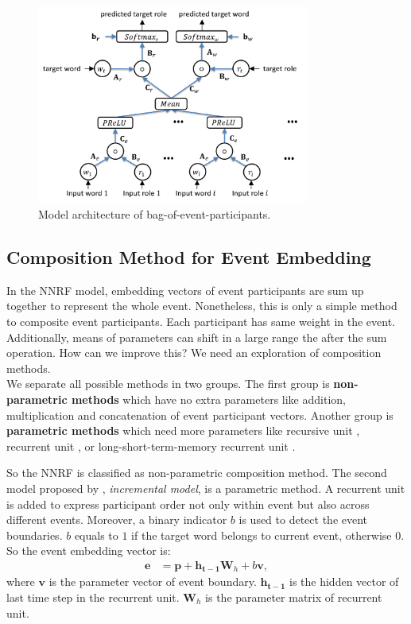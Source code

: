 \documentclass[a4paper]{article}
\begin{document}
\begin{figure}[t]
\centering
\includegraphics[width=0.8\textwidth]{BOP.png}
\caption{\label{fig:BOP} Model architecture of bag-of-event-participants.}
\end{figure}


\subsection{Composition Method for Event Embedding} \label{sec:composition}
In the NNRF model, embedding vectors of event participants are sum up together to represent the whole event. Nonetheless, this is only a simple method to composite event participants. Each participant has same weight in the event. Additionally, means of parameters can shift in a large range the after the sum operation. How can we improve this? We need an exploration of composition methods. \\
We separate all possible methods in two groups. The first group is \textbf{non-parametric methods} which have no extra parameters like addition, multiplication and concatenation of event participant vectors. Another group is \textbf{parametric methods} which need more parameters like recursive unit \citep{socher2013recursive}, recurrent unit \citet{mikolov2010recurrent}, or long-short-term-memory recurrent unit \citep{hochreiter1997LSTM}. 

So the NNRF is classified as non-parametric composition method. The second model proposed by \citet{tilk2016event}, \textit{incremental model}, is a parametric method. A recurrent unit is added to express participant order not only within event but also across different events. Moreover, a binary indicator $b$ is used to detect the event boundaries. $b$ equals to $1$ if the target word belongs to current event, otherwise $0$. So the event embedding vector is: 
\begin{equation} \label{eq:incremental}
\begin{aligned}
    \mathbf{e} 
        &= \mathbf{p} + \mathbf{h_{t-1}}\mathbf{W}_h + b\mathbf{v}, 
\end{aligned}
\end{equation}
where $\mathbf{v}$ is the parameter vector of event boundary. $\mathbf{h_{t-1}}$ is the hidden vector of last time step in the recurrent unit. $\mathbf{W}_h$ is the parameter matrix of recurrent unit. 
\end{document}
